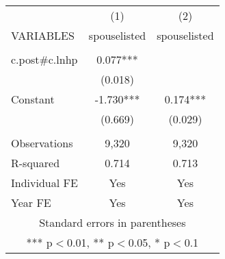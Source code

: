 \begin{tabular}{lcc} \hline
 & (1) & (2) \\
VARIABLES & spouselisted & spouselisted \\ \hline
 &  &  \\
c.post\#c.lnhp & 0.077*** &  \\
 & (0.018) &  \\
Constant & -1.730*** & 0.174*** \\
 & (0.669) & (0.029) \\
 &  &  \\
Observations & 9,320 & 9,320 \\
R-squared & 0.714 & 0.713 \\
Individual FE & Yes & Yes \\
 Year FE & Yes & Yes \\ \hline
\multicolumn{3}{c}{ Standard errors in parentheses} \\
\multicolumn{3}{c}{ *** p$<$0.01, ** p$<$0.05, * p$<$0.1} \\
\end{tabular}
